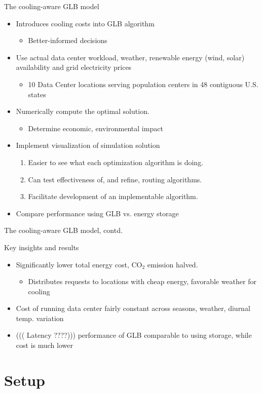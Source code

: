 \documentclass[xcolor=dvipsnames]{beamer}
\newcommand{\carbondioxide}{\ensuremath{\mathrm{CO}_2}}
\newcommand{\bi}{\begin{itemize}}
\newcommand{\ei}{\end{itemize}}
\newcommand{\itm}{\item}
\begin{document}
\begin{frame}{The cooling-aware GLB model}

		\begin{itemize}
			\item{Introduces cooling costs into GLB algorithm}
			\bi
				\item Better-informed decisions  
			\ei
			\item{Use actual data center workload, weather, renewable energy (wind, solar) availability and grid electricity prices}
			\bi
				\itm {10 Data Center locations serving population centers in 48 contiguous U.S. states}		
			\ei
			\item{Numerically compute the optimal solution.}
			\bi
				\itm Determine economic, environmental impact
			\ei
			\item{Implement visualization of simulation solution \\
				\begin{enumerate}
					\item{Easier to see what each optimization algorithm is doing.}
					\item{Can test effectiveness of, and refine, routing algorithms.} 
					\item{Facilitate development of an implementable algorithm.}
				\end{enumerate}
				}			
			\itm Compare performance using GLB vs. energy storage			
		\end{itemize}

\end{frame}

\begin{frame}{The cooling-aware GLB model, contd.}

	\begin{block}{Key insights and results}
	\bi
		\item{Significantly lower total energy cost, \carbondioxide{} emission halved.}  %
		\bi
			\itm Distributes requests to locations with cheap energy, favorable weather for cooling  %
		\ei
		\itm{Cost of running data center fairly constant across seasons, weather, diurnal temp. variation}  
		\itm {((( Latency ????))) performance of GLB comparable to using storage, while cost is much lower}
	\ei
	\end{block}

\end{frame}

\section{Setup}
\end{document}
